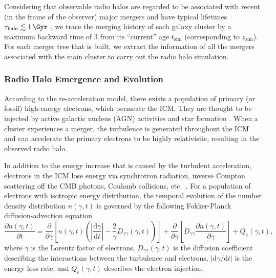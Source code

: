 \documentclass[modern]{aastex62}
\newcommand{\R}[1]{\mathrm{#1}}
\newcommand{\D}[1]{\R{d} #1}
\newcommand{\diff}[2]{\frac{\D{#1}}{\D{#2}}}
\newcommand{\pdiff}[2]{\frac{\partial #1}{\partial #2}}
\begin{document}
Considering that observable radio halos are regarded to be associated
with recent (in the frame of the observer) major mergers
and have typical lifetimes $\tau_{\R{halo}} \lesssim \SI{1}{\Gyr}$
\citep[e.g.,][]{brunetti2009,cassano2016},
we trace the merging history of each galaxy cluster by a maximum
backward time of \SI{3}{\Gyr} from its \enquote{current} age
$t_{\R{sim}}$ (corresponding to $z_{\R{sim}}$).
For each merger tree that is built, we extract the information of all
the mergers associated with the main cluster to carry out the
radio halo simulation.


\subsubsection{Radio Halo Emergence and Evolution}
\label{sec:halos}

According to the re-acceleration model, there exists a population of
primary (or fossil) high-energy electrons, which permeate the ICM.
They are thought to be injected by active galactic nucleus (AGN)
activities and star formation \citep[see][for a review]{blasi2007rev}.
When a cluster experiences a merger, the turbulence is generated
throughout the ICM and can accelerate the primary electrons to be highly
relativistic, resulting in the observed radio halo.

In addition to the energy increase that is caused by the turbulent
acceleration, electrons in the ICM lose energy via synchrotron radiation,
inverse Compton scattering off the CMB photons,
Coulomb collisions, etc.\ \citep{sarazin1999}.
For a population of electrons with isotropic energy distribution, the
temporal evolution of the number density distribution $n(\gamma, t)$
is governed by the following Fokker-Planck diffusion-advection equation
\citep{eilek1991,schlickeiser2002}
\begin{equation}
  \label{eq:fokkerplanck}
  \pdiff{n(\gamma,t)}{t} = \pdiff{}{\gamma} \left[ n(\gamma,t) \left(
      \left| \diff{\gamma}{t} \right| -
      \frac{2}{\gamma} D_{\gamma\gamma}(\gamma, t) \right) \right] +
    \pdiff{}{\gamma} \left[ D_{\gamma\gamma} \pdiff{n(\gamma,t)}{\gamma}
    \right] + Q_e(\gamma,t),
\end{equation}
where $\gamma$ is the Lorentz factor of electrons,
$D_{\gamma\gamma}(\gamma, t)$ is the diffusion coefficient describing
the interactions between the turbulence and electrons,
$|\R{d}\gamma / \R{d}t|$ is the energy loss rate,
and $Q_e(\gamma, t)$ describes the electron injection.
\end{document}

